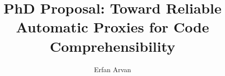 \documentclass[manuscript,review]{acmart}
\begin{document}
\title{PhD Proposal: Toward Reliable Automatic Proxies for Code Comprehensibility}

\author{Erfan Arvan}




\begin{abstract}

\end{abstract}


\end{document}
